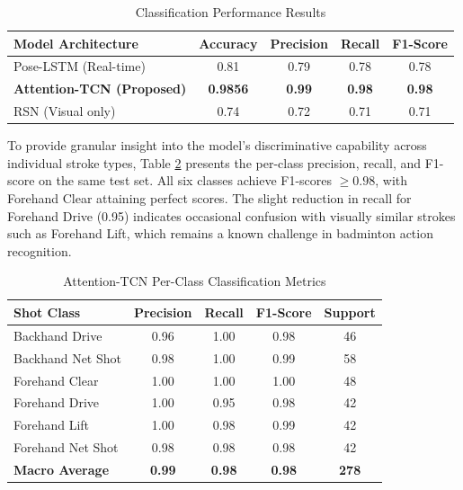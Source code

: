 \documentclass[pdflatex,sn-mathphys-num]{sn-jnl}
\theoremstyle{thmstyleone}%
\theoremstyle{thmstyletwo}%
\theoremstyle{thmstylethree}%
\begin{document}
\begin{table}[h]
\caption{Classification Performance Results}\label{tab_results}
\centering
\setlength{\tabcolsep}{6pt}
\renewcommand{\arraystretch}{1.3}
\begin{tabular}{|l|c|c|c|c|}
\hline
\textbf{Model Architecture} & \textbf{Accuracy} & \textbf{Precision} & \textbf{Recall} & \textbf{F1-Score} \\
\hline
Pose-LSTM (Real-time) & 0.81 & 0.79 & 0.78 & 0.78 \\
\hline
\textbf{Attention-TCN (Proposed)} & \textbf{0.9856} & \textbf{0.99} & \textbf{0.98} & \textbf{0.98} \\
\hline
RSN (Visual only) & 0.74 & 0.72 & 0.71 & 0.71 \\
\hline
\end{tabular}
\end{table}

To provide granular insight into the model's discriminative capability across individual stroke types, Table \ref{tab_perclass} presents the per-class precision, recall, and F1-score on the same test set. All six classes achieve F1-scores $\ge 0.98$, with Forehand Clear attaining perfect scores. The slight reduction in recall for Forehand Drive (0.95) indicates occasional confusion with visually similar strokes such as Forehand Lift, which remains a known challenge in badminton action recognition.

\begin{table}[h]
\caption{Attention-TCN Per-Class Classification Metrics}\label{tab_perclass}
\centering
\setlength{\tabcolsep}{5pt}
\renewcommand{\arraystretch}{1.3}
\begin{tabular}{|l|c|c|c|c|}
\hline
\textbf{Shot Class} & \textbf{Precision} & \textbf{Recall} & \textbf{F1-Score} & \textbf{Support} \\
\hline
Backhand Drive & 0.96 & 1.00 & 0.98 & 46 \\
\hline
Backhand Net Shot & 0.98 & 1.00 & 0.99 & 58 \\
\hline
Forehand Clear & 1.00 & 1.00 & 1.00 & 48 \\
\hline
Forehand Drive & 1.00 & 0.95 & 0.98 & 42 \\
\hline
Forehand Lift & 1.00 & 0.98 & 0.99 & 42 \\
\hline
Forehand Net Shot & 0.98 & 0.98 & 0.98 & 42 \\
\hline
\textbf{Macro Average} & \textbf{0.99} & \textbf{0.98} & \textbf{0.98} & \textbf{278} \\
\hline
\end{tabular}
\end{table}
\end{document}
